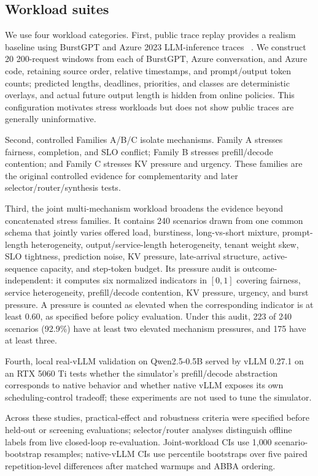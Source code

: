 \documentclass[runningheads]{llncs}
\begin{document}
\subsection{Workload suites}

We use four workload categories. First, public trace replay provides a realism
baseline using BurstGPT and Azure 2023 LLM-inference traces
~\cite{burstgpt2025,azurepublicdataset2023,splitwise2024}. We construct 20
200-request windows from each of BurstGPT, Azure conversation, and Azure code,
retaining source order, relative timestamps, and prompt/output token counts;
predicted lengths, deadlines, priorities, and classes are deterministic
overlays, and actual future output length is hidden from online policies.
This configuration motivates stress workloads but does not show public traces
are generally uninformative.

Second, controlled Families A/B/C isolate mechanisms. Family A stresses
fairness, completion, and SLO conflict; Family B stresses prefill/decode
contention; and Family C stresses KV pressure and urgency. These families are
the original controlled evidence for complementarity and later
selector/router/synthesis tests.

Third, the joint multi-mechanism workload broadens the evidence beyond
concatenated stress families. It contains 240 scenarios drawn from one common
schema that jointly varies offered load, burstiness, long-vs-short mixture,
prompt-length heterogeneity, output/service-length heterogeneity, tenant weight
skew, SLO tightness, prediction noise, KV pressure, late-arrival structure,
active-sequence capacity, and step-token budget. Its pressure audit is
outcome-independent: it computes six normalized indicators in $[0,1]$
covering fairness, service heterogeneity, prefill/decode contention, KV
pressure, urgency, and burst pressure. A pressure is counted as elevated when
the corresponding indicator is at least 0.60, as specified before policy
evaluation. Under this audit, 223 of 240 scenarios (92.9\%) have at least two
elevated mechanism pressures, and 175 have at least three.

Fourth, local real-vLLM validation on Qwen2.5-0.5B served by vLLM 0.27.1 on an
RTX 5060 Ti tests whether the simulator's prefill/decode abstraction
corresponds to native behavior and whether native vLLM exposes its own
scheduling-control tradeoff; these experiments are not used to tune the
simulator.

Across these studies, practical-effect and robustness criteria were specified
before held-out or screening evaluations; selector/router analyses distinguish
offline labels from live closed-loop re-evaluation. Joint-workload CIs use
1{,}000 scenario-bootstrap resamples; native-vLLM CIs use percentile bootstraps
over five paired repetition-level differences after matched warmups and ABBA
ordering.
\end{document}
